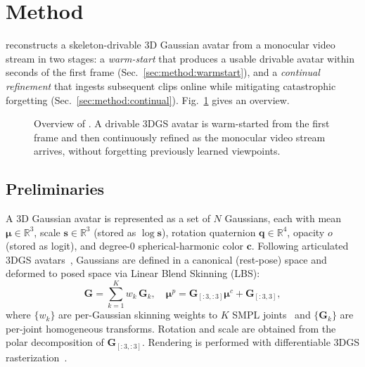 \section{Method}\label{sec:method}

\method{} reconstructs a skeleton-drivable 3D Gaussian avatar from a
monocular video stream in two stages: a \emph{warm-start} that produces a
usable drivable avatar within seconds of the first frame
(Sec.~\ref{sec:method:warmstart}), and a \emph{continual refinement} that
ingests subsequent clips online while mitigating catastrophic forgetting
(Sec.~\ref{sec:method:continual}). Fig.~\ref{fig:pipeline} gives an
overview.

\begin{figure}[t]
  \centering
  \caption{Overview of \method{}. A drivable 3DGS avatar is warm-started
  from the first frame and then continuously refined as the monocular
  video stream arrives, without forgetting previously learned viewpoints.}
  \label{fig:pipeline}
\end{figure}

\subsection{Preliminaries}\label{sec:method:prelim}
A 3D Gaussian avatar is represented as a set of $N$ Gaussians, each with
mean $\bm{\mu}\!\in\!\mathbb{R}^3$, scale $\bm{s}\!\in\!\mathbb{R}^3$ (stored
as $\log\bm{s}$), rotation quaternion $\bm{q}\!\in\!\mathbb{R}^4$, opacity
$o$ (stored as logit), and degree-0 spherical-harmonic color $\bm{c}$.
Following articulated 3DGS
avatars~\cite{hu2024gauhuman,hu2024gaussianavatar}, Gaussians are defined
in a canonical (rest-pose) space and deformed to posed space via Linear
Blend Skinning (LBS):
\begin{equation}
  \bm{G} = \sum_{k=1}^{K} w_k\, \bm{G}_k,\quad
  \bm{\mu}^{p} = \bm{G}_{[:3,:3]}\bm{\mu}^{c} + \bm{G}_{[:3,3]},
  \label{eq:lbs}
\end{equation}
where $\{w_k\}$ are per-Gaussian skinning weights to $K$ SMPL
joints~\cite{loper2015smpl} and $\{\bm{G}_k\}$ are per-joint
homogeneous transforms. Rotation and scale are obtained from the polar
decomposition of $\bm{G}_{[:3,:3]}$. Rendering is performed with
differentiable 3DGS rasterization~\cite{kerbl3Dgaussians,ye2024gsplat}.

